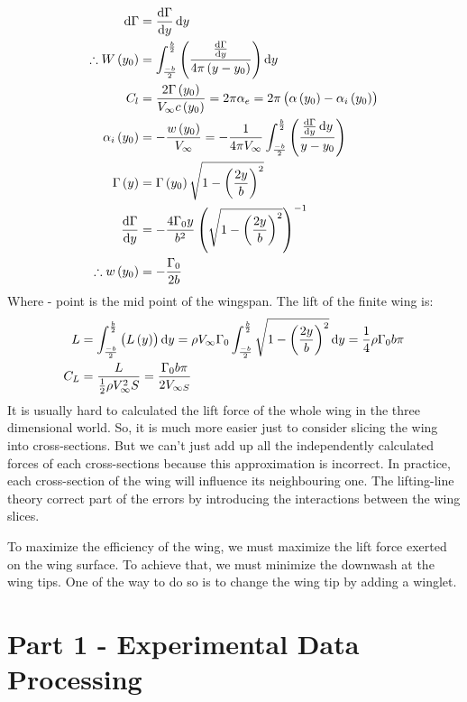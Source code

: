 \documentclass[11pt]{article}
\numberwithin{equation}{section}
\begin{document}
\begin{align}
  \dif \Gamma &= \frac{\dif \Gamma}{\dif y} \dif y\\
  \therefore W\left(y_0\right) &= \int_{\frac{-b}{2}}^{\frac{b}{2}} \left(\frac{\frac{\dif \Gamma}{\dif y}}{4\pi \left(y-y_0\right)}\right) \dif y\\
  C_l &= \frac{2\Gamma\left(y_0\right)}{V_{\infty}c\left(y_0\right)} = 2\pi \alpha_e = 2\pi\left(\alpha\left(y_0\right) - \alpha_i \left(y_0\right)\right)\\
  \alpha_i \left( y_0 \right) &= -\frac{w\left( y_0 \right)}{V_{\infty}} = -\frac{1}{4\pi V_{\infty}} \int_{\frac{-b}{2}}^{\frac{b}{2}} \left( \frac{\frac{\dif \Gamma}{\dif y}\dif y}{y - y_0} \right)\\
  \Gamma \left(y\right) &= \Gamma \left(y_0\right) \sqrt{1 - \left(\frac{2y}{b}\right)^2}\\
  \frac{\dif \Gamma}{\dif y} &= -\frac{4\Gamma_0 y}{b^2} \left(\sqrt{1-\left(\frac{2y}{b}\right)^2}\right)^{-1}\\
  \therefore w\left(y_0\right) &= -\frac{\Gamma_0}{2b}
\end{align}
Where - point is the mid point of the wingspan. The lift of the finite wing is:
\begin{align}
  L &= \int_{\frac{-b}{2}}^{\frac{b}{2}} \left(L\left(y\right)\right)\dif y = \rho V_{\infty} \Gamma_0 \int_{\frac{-b}{2}}^{\frac{b}{2}} \sqrt{1-\left(\frac{2y}{b}\right)^2} \dif y = \frac{1}{4}\rho \Gamma_0 b\pi\\
  C_L &= \frac{L}{\frac{1}{2}\rho V_{\infty}^2 S} = \frac{\Gamma_0 b \pi}{2V_{\infty S}}
\end{align}
It is usually hard to calculated the lift force of the whole wing in the three dimensional world. So, it is much more easier just to consider slicing the wing into cross-sections. But we can’t just add up all the independently calculated forces of each cross-sections because this approximation is incorrect. In practice, each cross-section of the wing will influence its neighbouring one. The lifting-line theory correct part of the errors by introducing the interactions between the wing slices. 

To maximize the efficiency of the wing, we must maximize the lift force exerted on the wing surface. To achieve that, we must minimize the downwash at the wing tips. One of the way to do so is to change the wing tip by adding a winglet.
\section*{Part 1 - Experimental Data Processing}
\end{document}
